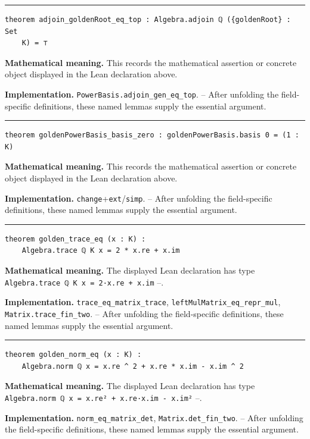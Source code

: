 \documentclass[UTF8,a4paper,11pt,fontset=fandol]{ctexart}
\theoremstyle{definition}
\newcommand{\statementsep}{\par\medskip\hrule\medskip}
\begin{document}
\statementsep
\begin{verbatim}
theorem adjoin_goldenRoot_eq_top : Algebra.adjoin ℚ ({goldenRoot} : Set
    K) = ⊤
\end{verbatim}
\noindent\textbf{Mathematical meaning.} This records the mathematical assertion or concrete object displayed in the Lean declaration above.\par
\noindent\textbf{Implementation.} \texttt{PowerBasis.\allowbreak{}adjoin\_\allowbreak{}gen\_\allowbreak{}eq\_\allowbreak{}top}. -- After unfolding the field-specific definitions, these named lemmas supply the essential argument.\par
\statementsep
\begin{verbatim}
theorem goldenPowerBasis_basis_zero : goldenPowerBasis.basis 0 = (1 : K)
\end{verbatim}
\noindent\textbf{Mathematical meaning.} This records the mathematical assertion or concrete object displayed in the Lean declaration above.\par
\noindent\textbf{Implementation.} \texttt{change}+\texttt{ext}/\texttt{simp}. -- After unfolding the field-specific definitions, these named lemmas supply the essential argument.\par
\statementsep
\begin{verbatim}
theorem golden_trace_eq (x : K) :
    Algebra.trace ℚ K x = 2 * x.re + x.im
\end{verbatim}
\noindent\textbf{Mathematical meaning.} The displayed Lean declaration has type \texttt{Algebra.\allowbreak{}trace ℚ K x = 2·x.\allowbreak{}re + x.\allowbreak{}im} --.\par
\noindent\textbf{Implementation.} \texttt{trace\_\allowbreak{}eq\_\allowbreak{}matrix\_\allowbreak{}trace}, \texttt{leftMulMatrix\_\allowbreak{}eq\_\allowbreak{}repr\_\allowbreak{}mul}, \texttt{Matrix.\allowbreak{}trace\_\allowbreak{}fin\_\allowbreak{}two}. -- After unfolding the field-specific definitions, these named lemmas supply the essential argument.\par
\statementsep
\begin{verbatim}
theorem golden_norm_eq (x : K) :
    Algebra.norm ℚ x = x.re ^ 2 + x.re * x.im - x.im ^ 2
\end{verbatim}
\noindent\textbf{Mathematical meaning.} The displayed Lean declaration has type \texttt{Algebra.\allowbreak{}norm ℚ x = x.\allowbreak{}re² + x.\allowbreak{}re·x.\allowbreak{}im - x.\allowbreak{}im²} --.\par
\noindent\textbf{Implementation.} \texttt{norm\_\allowbreak{}eq\_\allowbreak{}matrix\_\allowbreak{}det}, \texttt{Matrix.\allowbreak{}det\_\allowbreak{}fin\_\allowbreak{}two}. -- After unfolding the field-specific definitions, these named lemmas supply the essential argument.\par
\end{document}
